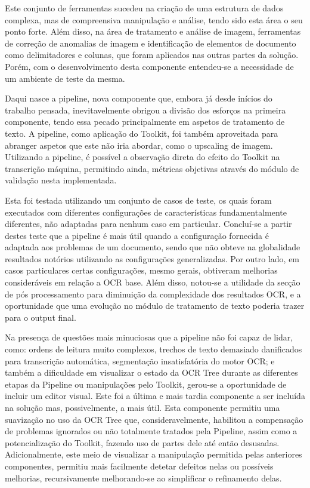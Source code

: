 Este conjunto de ferramentas sucedeu na criação de uma estrutura de dados complexa, mas de compreensiva manipulação e análise, tendo sido esta área o seu ponto forte. Além disso, na área de tratamento e análise de imagem, ferramentas de correção de anomalias de imagem e identificação de elementos de documento como delimitadores e colunas, que foram aplicados nas outras partes da solução. Porém, com o desenvolvimento desta componente entendeu-se a necessidade de um ambiente de teste da mesma. 

Daqui nasce a pipeline, nova componente que, embora já desde inícios do trabalho pensada, inevitavelmente obrigou a divisão dos esforços na primeira componente, tendo essa pecado principalmente em aspetos de tratamento de texto.
A pipeline, como aplicação do Toolkit, foi também aproveitada para abranger aspetos que este não iria abordar, como o upscaling de imagem. Utilizando a pipeline, é possível a observação direta do efeito do Toolkit na transcrição máquina, permitindo ainda, métricas objetivas através do módulo de validação nesta implementada.

Esta foi testada utilizando um conjunto de casos de teste, os quais foram executados com diferentes configurações de características fundamentalmente diferentes, não adaptadas para nenhum caso em particular. Concluí-se a partir destes teste que a pipeline é mais útil quando a configuração fornecida é adaptada aos problemas de um documento, sendo que não obteve na globalidade resultados notórios utilizando as configurações generalizadas. Por outro lado, em casos particulares certas configurações, mesmo gerais, obtiveram melhorias consideráveis em relação a OCR base. Além disso, notou-se a utilidade da secção de pós processamento para diminuição da complexidade dos resultados OCR, e a oportunidade que uma evolução no módulo de tratamento de texto poderia trazer para o output final.

Na presença de questões mais minuciosas que a pipeline não foi capaz de lidar, como: ordens de leitura muito complexos, trechos de texto demasiado danificados para transcrição automática, segmentação insatisfatória do motor OCR; e também a dificuldade em visualizar o estado da OCR Tree durante as diferentes etapas da Pipeline ou manipulações pelo Toolkit, gerou-se a oportunidade de incluir um editor visual. Este foi a última e mais tardia componente a ser incluída na solução mas, possivelmente, a mais útil. Esta componente permitiu uma suavização no uso da OCR Tree que, consideravelmente, habilitou a compensação de problemas ignorados ou não totalmente tratados pela Pipeline, assim como a potencialização do Toolkit, fazendo uso de partes dele até então desusadas. Adicionalmente, este meio de visualizar a manipulação permitida pelas anteriores componentes, permitiu mais facilmente detetar defeitos nelas ou possíveis melhorias, recursivamente melhorando-se ao simplificar o refinamento delas.

